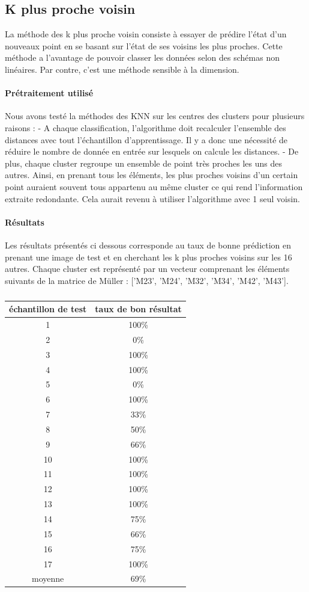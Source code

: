 \documentclass[a4paper,10pt]{report}
\begin{document}
\subsection{K plus proche voisin}
La méthode des k plus proche voisin consiste à essayer de prédire l’état d'un nouveaux point en se basant sur l'état de ses voisins les plus proches. Cette méthode a l'avantage de pouvoir classer les données selon des schémas non linéaires. Par contre, c'est une méthode sensible à la dimension. 
\paragraph{Prétraitement utilisé}
Nous avons testé la méthodes des KNN sur les centres des clusters pour plusieurs raisons :
- A chaque classification, l'algorithme doit recalculer l'ensemble des distances avec tout l’échantillon d'apprentissage. Il y a donc une nécessité de réduire le nombre de donnée en entrée sur lesquels on calcule les distances.
- De plus, chaque cluster regroupe un ensemble de point très proches les uns des autres. Ainsi, en prenant tous les éléments, les plus proches voisins d'un certain point auraient souvent tous appartenu au même cluster ce qui rend l'information extraite redondante. Cela aurait revenu à utiliser l'algorithme avec 1 seul voisin. 
\paragraph{Résultats}
Les résultats présentés ci dessous corresponde au taux de bonne prédiction en prenant une image de test et en cherchant les k plus proches voisins sur les 16 autres. Chaque cluster est représenté par un vecteur comprenant les éléments suivants de la matrice de Müller : ['M23', 'M24', 'M32', 'M34', 'M42', 'M43'].
\subparagraph{}
\begin{center}
\begin{tabular}{|c|c|}  
  \hline
  échantillon de test & taux de bon résultat \\
  \hline
  1 & 100\%\\
  2 & 0\%\\
  3 & 100\%\\
  4 & 100\%\\
  5 & 0\%\\
  6  & 100\%\\
  7 & 33\%\\  
  8 & 50\%\\
  9 & 66\%\\
  10 & 100\%\\
  11 & 100\%\\
  12 & 100\%\\
  13 & 100\%\\
  14 & 75\%\\
  15 & 66\%\\
  16 & 75\%\\
  17 & 100\%\\
  \hline
  moyenne & 69\%\\  
  \hline
\end{tabular}
\end{center}
\end{document}
